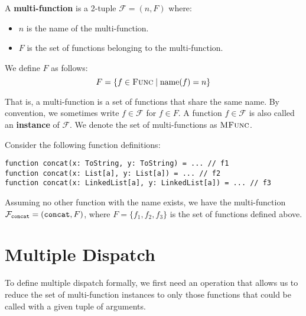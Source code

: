 \noindent A \textbf{multi-function} is a 2-tuple $\mathcal{F} = (n, F)$ where:
\begin{itemize}
	\item $n$ is the name of the multi-function.
	\item $F$ is the set of functions belonging to the multi-function.
\end{itemize}

\noindent We define $F$ as follows:
\begin{equation*}
	F = \{ f \in \textsc{Func} \mid \operatorname{name}(f) = n \}
\end{equation*}

\noindent That is, a multi-function is a set of functions that share the same name. By convention, we sometimes write $f \in \mathcal{F}$ for $f \in F$. A function $f \in \mathcal{F}$ is also called an \textbf{instance} of $\mathcal{F}$. We denote the set of multi-functions as $\textsc{MFunc}$.

\begin{example}
	Consider the following function definitions:
	\begin{lstlisting}
function concat(x: ToString, y: ToString) = ... // f1
function concat(x: List[a], y: List[a]) = ... // f2
function concat(x: LinkedList[a], y: LinkedList[a]) = ... // f3
	\end{lstlisting}
	
	\noindent Assuming no other function with the name  exists, we have the multi-function $\mathcal{F}_{\text{\texttt{concat}}} = (\text{\texttt{concat}}, F)$, where $F = \{ f_1, f_2, f_3 \}$ is the set of  functions defined above.
\end{example}



\section{Multiple Dispatch}

To define multiple dispatch formally, we first need an operation that allows us to reduce the set of multi-function instances to only those functions that could be called with a given tuple of arguments.



